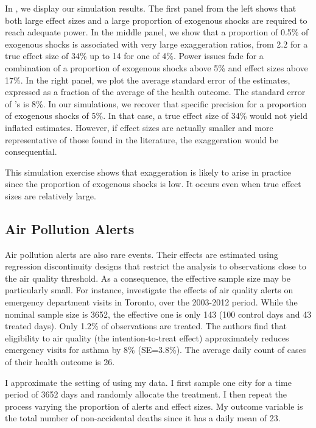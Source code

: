 \documentclass[12pt]{article}
\begin{document}
            In , we display our simulation results. The first panel from the left shows that both large effect sizes and a large proportion of exogenous shocks are required to reach adequate power. In the middle panel, we show that a proportion of 0.5\% of exogenous shocks is associated with very large exaggeration ratios, from 2.2 for a true effect size of 34\% up to 14 for one of 4\%. Power issues fade for a combination of a proportion of exogenous shocks above 5\% and effect sizes above 17\%. In the right panel, we plot the average standard error of the estimates, expressed as a fraction of the average of the health outcome. The standard error of \cite{bauernschuster_when_2017}'s is 8\%. In our simulations, we recover that specific precision for a proportion of exogenous shocks of 5\%. In that case, a true effect size of 34\% would not yield inflated estimates. However, if effect sizes are actually smaller and more representative of those found in the literature, the exaggeration would be consequential.
            
            This simulation exercise shows that exaggeration is likely to arise in practice since the proportion of exogenous shocks is low. It occurs even when true effect sizes are relatively large.
        
        \subsection*{Air Pollution Alerts}
            
            Air pollution alerts are also rare events. Their effects are estimated using regression discontinuity designs that restrict the analysis to observations close to the air quality threshold. As a consequence, the effective sample size may be particularly small. For instance, \cite{chen_effect_2018} investigate the effects of air quality alerts on emergency department visits in Toronto, over the 2003-2012 period. While the nominal sample size is 3652, the effective one is only 143 (100 control days and 43 treated days). Only 1.2\% of observations are treated. The authors find that eligibility to air quality (the intention-to-treat effect) approximately reduces emergency visits for asthma by 8\% (SE=3.8\%). The average daily count of cases of their health outcome is 26.
        
            I approximate the setting of \cite{chen_effect_2018} using my data. I first sample one city for a time period of 3652 days and randomly allocate the treatment. I then repeat the process varying the proportion of alerts and effect sizes. My outcome variable is the total number of non-accidental deaths since it has a daily mean of 23.
            
\end{document}
